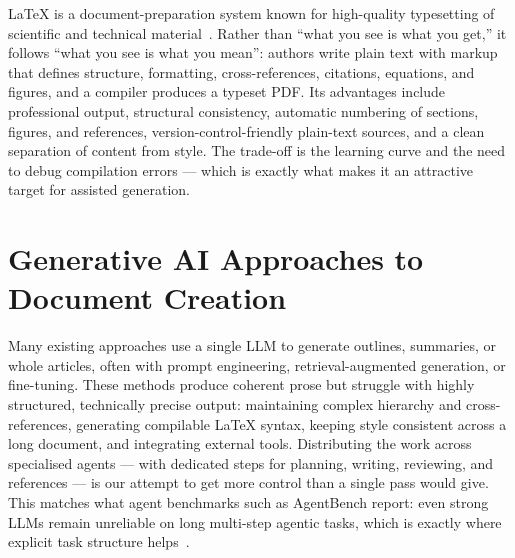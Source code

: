 \LaTeX{} is a document-preparation system known for high-quality typesetting
of scientific and technical material~\cite{lamport1994latex}. Rather than
``what you see is what you get,'' it follows ``what you see is what you
mean'': authors write plain text with markup that defines structure,
formatting, cross-references, citations, equations, and figures, and a
compiler produces a typeset PDF. Its advantages include professional output,
structural consistency, automatic numbering of sections, figures, and
references, version-control-friendly plain-text sources, and a clean
separation of content from style. The trade-off is the learning curve and the
need to debug compilation errors --- which is exactly what makes it an
attractive target for assisted generation.

\section{Generative AI Approaches to Document Creation}

Many existing approaches use a single LLM to generate outlines, summaries, or
whole articles, often with prompt engineering, retrieval-augmented
generation, or fine-tuning. These methods produce coherent prose but struggle
with highly structured, technically precise output: maintaining complex
hierarchy and cross-references, generating compilable \LaTeX{} syntax,
keeping style consistent across a long document, and integrating external
tools. Distributing the work across specialised agents --- with dedicated
steps for planning, writing, reviewing, and references --- is our attempt to
get more control than a single pass would give. This matches what agent
benchmarks such as AgentBench report: even strong LLMs remain unreliable on
long multi-step agentic tasks, which is exactly where explicit task structure
helps~\cite{agentbench2023}.

